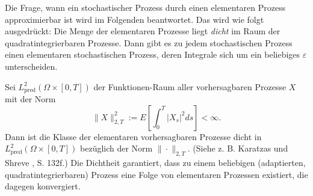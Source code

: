 \begin{satz}
Die Frage, wann ein stochastischer Prozess durch einen elementaren Prozess approximierbar ist wird im Folgenden 
beantwortet. Das wird wie folgt ausgedrückt: Die Menge der elementaren Prozesse liegt \textit{dicht} im Raum
der quadratintegrierbaren Prozesse. Dann gibt es zu jedem stochastischen Prozess einen elementaren stochastischen
Prozess, deren Integrale sich um ein beliebiges $\varepsilon$ unterscheiden.

Sei $L^2_{\mathrm{pred}}(\Omega\times[0,T])$ der Funktionen-Raum aller vorhersagbaren Prozesse $X$ mit der Norm
$$\|X\|_{2,T}^2 := E \left [ \int_0^T |X_s|^2 ds \right ] < \infty.$$
Dann ist die Klasse der elementaren vorhersagbaren Prozesse dicht in $L^2_{\mathrm{pred}}(\Omega\times[0,T])$ bezüglich der Norm $\|\cdot\|_{2,T}$. (Siehe z. B. Karatzas und Shreve \cite{karatzas_brownian_1991}, S. 132f.) 
Die Dichtheit garantiert, dass zu einem beliebigen (adaptierten, quadratintegrierbaren) Prozess 
eine Folge von elementaren Prozessen existiert, die dagegen konvergiert.
\end{satz}

